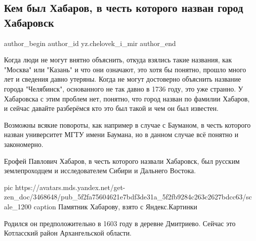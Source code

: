  
 
 
 
 
 
\subsection{Кем был Хабаров, в честь которого назван город Хабаровск}
\label{sec:14_10_2020.sites.ru.zen_yandex.yz.chelovek_i_mir.1.habarov}
\ifcmt
	author_begin
   author_id yz.chelovek_i_mir
	author_end
\fi


Когда люди не могут внятно объяснить, откуда взялись такие названия, как
"Москва" или "Казань" и что они означают, это хотя бы понятно, прошло много лет
и сведения давно утеряны. Когда не могут достоверно объяснить название города
"Челябинск", основанного не так давно в 1736 году, это уже странно. У
Хабаровска с этим проблем нет, понятно, что город назван по фамилии Хабаров, и
сейчас давайте разберёмся кто это был такой и чем он был известен.

Возможны всякие повороты, как например в случае с Бауманом, в честь которого
назван университет МГТУ имени Баумана, но в данном случае всё понятно и
закономерно.

Ерофей Павлович Хабаров, в честь которого назвали Хабаровск, был русским
землепроходцем и исследователем Сибири и Дальнего Востока.

\ifcmt
  pic https://avatars.mds.yandex.net/get-zen_doc/3468648/pub_5f2fa75604621e7bdf3de31a_5f2fb9284c263c2627bdcc63/scale_1200
	caption Памятник Хабарову, взято с Яндекс.Картинки
\fi

Родился он предположительно в 1603 году в деревне Дмитриево. Сейчас это
Котласский район Архангельской области.

